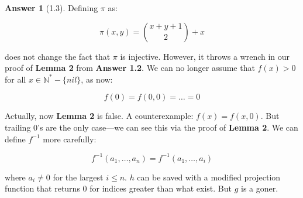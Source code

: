 \documentclass[11pt]{article}
\theoremstyle{plain}
\theoremstyle{definition}
\newtheorem*{ans}{Answer}
\newcommand{\N}{\mathbb{N}}
\begin{document}
\begin{ans}[1.3]
    Defining $\pi$ as:

	$$\pi(x, y) = \binom{x + y + 1}{2} + x$$

    does not change the fact that $\pi$ is injective. However, it throws a wrench in our proof of {\bf Lemma 2} from 
    {\bf Answer 1.2}. We can no longer assume that $f(x) > 0$ for all $x \in \N^* - \{nil\}$, as now:

    $$f(0) = f(0, 0) = \ldots = 0$$

    Actually, now {\bf Lemma 2} is false. A counterexample: $f(x) = f(x, 0)$. But trailing 0's are the only case---we can 
    see this via the proof of {\bf Lemma 2}. We can define $f^{-1}$ more carefully: 

    $$f^{-1}(a_1, \ldots, a_n) = f^{-1}(a_1, \ldots, a_i)$$

    where $a_i \neq 0$ for the largest $i \leq n$. $h$ can be saved with a modified projection function that returns 0 for
    indices greater than what exist. But $g$ is a goner.
\end{ans}
\end{document}
